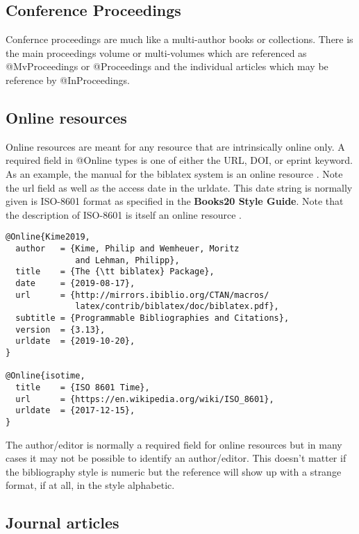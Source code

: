 \subsection{Conference Proceedings}

Confernce proceedings are much like a multi-author books or
collections.  There is the main proceedings volume or multi-volumes
which are referenced as {\ttfamily @MvProceedings} or {\ttfamily
  @Proceedings} and the individual articles which may be reference by
{\ttfamily @InProceedings}.

\subsection{Online resources}

Online resources are meant for any resource that are intrinsically
online only.  A required field in {\ttfamily @Online} types is one of
either the {\ttfamily URL}, {\ttfamily DOI}, or {\ttfamily eprint}
keyword. As an example, the manual for the {\ttfamily biblatex} system
is an online resource \cite{Kime2019}. Note the {\ttfamily url} field
as well as the access date in the {\ttfamily urldate}. This date
string is normally given is ISO-8601 format as specified in the
{\bfseries Books20 Style Guide}. Note that the description of ISO-8601
is itself an online resource \cite{isotime}.

\begin{verbatim}
@Online{Kime2019,
  author   = {Kime, Philip and Wemheuer, Moritz
              and Lehman, Philipp},
  title    = {The {\tt biblatex} Package},
  date     = {2019-08-17},
  url      = {http://mirrors.ibiblio.org/CTAN/macros/
              latex/contrib/biblatex/doc/biblatex.pdf},
  subtitle = {Programmable Bibliographies and Citations},
  version  = {3.13},
  urldate  = {2019-10-20},
}

@Online{isotime,
  title    = {ISO 8601 Time},
  url      = {https://en.wikipedia.org/wiki/ISO_8601},
  urldate  = {2017-12-15},
}
\end{verbatim}

The author/editor is normally a required field for online resources
but in many cases it may not be possible to identify an
author/editor. This doesn't matter if the bibliography style is
{\ttfamily numeric} but the reference will show up with a strange
format, if at all, in the style {\ttfamily alphabetic}.

\subsection{Journal articles}

